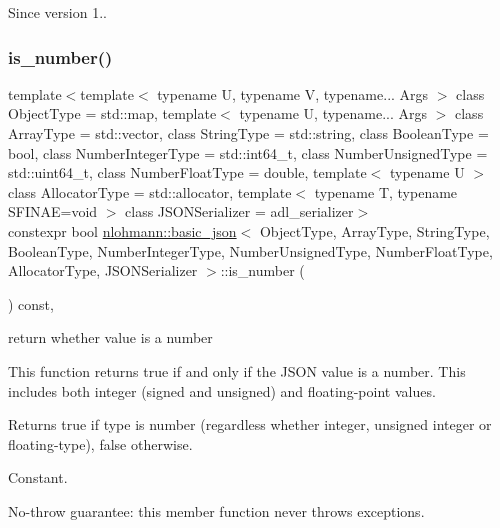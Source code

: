 \begin{DoxySince}{Since}
version 1.. 
\end{DoxySince}
\mbox{\label{classnlohmann_1_1basic__json_a2b9852390abb4b1ef5fac6984e2fc0f3}} 
\subsubsection{\texorpdfstring{is\+\_\+number()}{is\_number()}}
{\footnotesize\ttfamily template$<$template$<$ typename U, typename V, typename... Args $>$ class Object\+Type = std\+::map, template$<$ typename U, typename... Args $>$ class Array\+Type = std\+::vector, class String\+Type  = std\+::string, class Boolean\+Type  = bool, class Number\+Integer\+Type  = std\+::int64\+\_\+t, class Number\+Unsigned\+Type  = std\+::uint64\+\_\+t, class Number\+Float\+Type  = double, template$<$ typename U $>$ class Allocator\+Type = std\+::allocator, template$<$ typename T, typename S\+F\+I\+N\+A\+E=void $>$ class J\+S\+O\+N\+Serializer = adl\+\_\+serializer$>$ \\
constexpr bool \mbox{\hyperlink{classnlohmann_1_1basic__json}{nlohmann\+::basic\+\_\+json}}$<$ Object\+Type, Array\+Type, String\+Type, Boolean\+Type, Number\+Integer\+Type, Number\+Unsigned\+Type, Number\+Float\+Type, Allocator\+Type, J\+S\+O\+N\+Serializer $>$\+::is\+\_\+number (\begin{DoxyParamCaption}{ }\end{DoxyParamCaption}) const\hspace{0.3cm}{\ttfamily [inline]}, {\ttfamily [noexcept]}}



return whether value is a number 

This function returns true if and only if the J\+S\+ON value is a number. This includes both integer (signed and unsigned) and floating-\/point values.

\begin{DoxyReturn}{Returns}
{\ttfamily true} if type is number (regardless whether integer, unsigned integer or floating-\/type), {\ttfamily false} otherwise.
\end{DoxyReturn}
Constant.

No-\/throw guarantee\+: this member function never throws exceptions.


